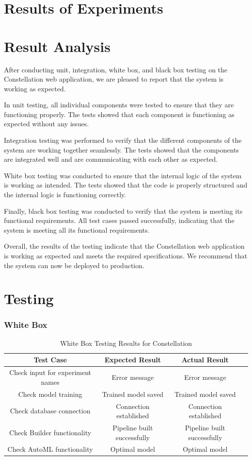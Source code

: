 \documentclass[12pt,a4paper]{report}     %
\begin{document}
\begin{normalsize}
{{{{\section{Results of Experiments }
\section{Result Analysis }
After conducting unit, integration, white box, and black box testing on the Constellation web application, we are pleased to report that the system is working as expected.

In unit testing, all individual components were tested to ensure that they are functioning properly. The tests showed that each component is functioning as expected without any issues.

Integration testing was performed to verify that the different components of the system are working together seamlessly. The tests showed that the components are integrated well and are communicating with each other as expected.

White box testing was conducted to ensure that the internal logic of the system is working as intended. The tests showed that the code is properly structured and the internal logic is functioning correctly.

Finally, black box testing was conducted to verify that the system is meeting its functional requirements. All test cases passed successfully, indicating that the system is meeting all its functional requirements.

Overall, the results of the testing indicate that the Constellation web application is working as expected and meets the required specifications. We recommend that the system can now be deployed to production.
\section{Testing}
\subsubsection{White Box}
\begin{table}[h]
\centering
\caption{White Box Testing Results for Constellation}
\label{tab:whitebox}
\begin{tabular}{|c|c|c|c|}
\hline
 \textbf{Test Case} & \textbf{Expected Result} & \textbf{Actual Result} \\ \hline
 Check input for experiment names & Error message  & Error message  \\ \hline
Check model training  & Trained model saved & Trained model saved \\ \hline
 Check database connection & Connection established & Connection established \\ \hline
 Check  Builder functionality & Pipeline built successfully & Pipeline built successfully \\ \hline
 Check AutoML functionality & Optimal model  & Optimal model  \\ \hline
\end{tabular}
\end{table}

}}}}
\end{normalsize}
\end{document}
